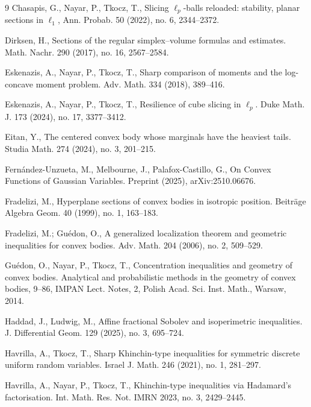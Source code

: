 \documentclass[10pt]{amsart}
\newcommand{\1}{\textbf{1}}
\newcommand{\red}{}
\theoremstyle{remark}
\theoremstyle{definition}
\begin{document}
\begin{thebibliography}{9}
Chasapis, G., Nayar, P., Tkocz, T.,  Slicing $\ell_p$-balls reloaded: stability, planar sections in $\ell_1$,  Ann. Probab. 50 (2022), no. 6, 2344--2372.


Dirksen, H., Sections of the regular simplex--volume formulas and estimates. Math. Nachr. 290 (2017), no. 16, 2567--2584.


Eskenazis, A., Nayar, P., Tkocz, T.,
Sharp comparison of moments and the log-concave moment problem.
Adv. Math. 334 (2018), 389--416.


Eskenazis, A., Nayar, P., Tkocz, T.,
Resilience of cube slicing in $\ell_p$. Duke Math. J. 173 (2024), no. 17, 3377--3412.


Eitan, Y.,
The centered convex body whose marginals have the heaviest tails.
Studia Math. 274 (2024), no. 3, 201--215.


{\red
{}
Fernández-Unzueta, M., Melbourne, J., Palafox-Castillo, G., On Convex Functions of Gaussian Variables. Preprint (2025), arXiv:2510.06676.
}

Fradelizi, M., Hyperplane sections of convex bodies in isotropic position. Beitr\"age Algebra Geom. 40 (1999), no. 1, 163--183. 


Fradelizi, M.; Gu\'edon, O., A generalized localization theorem and geometric inequalities for convex bodies. Adv. Math. 204 (2006), no. 2, 509--529.



Gu\'edon, O., Nayar, P., Tkocz, T., Concentration inequalities and geometry of convex bodies. Analytical and probabilistic methods in the geometry of convex bodies, 9–86, IMPAN Lect. Notes, 2, Polish Acad. Sci. Inst. Math., Warsaw, 2014.


Haddad, J., Ludwig, M., Affine fractional Sobolev and isoperimetric inequalities. J. Differential Geom. 129 (2025), no. 3, 695--724.

Havrilla, A., Tkocz, T., 
Sharp Khinchin-type inequalities for symmetric discrete uniform random variables. 
Israel J. Math. 246 (2021), no. 1, 281--297.

Havrilla, A., Nayar, P., Tkocz, T., Khinchin-type inequalities via Hadamard's factorisation.
Int. Math. Res. Not. IMRN 2023, no. 3, 2429--2445.



\end{thebibliography}
\end{document}
